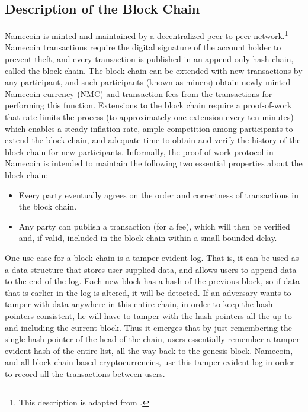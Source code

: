 \subsection{Description of the Block Chain}
Namecoin is minted and maintained by a decentralized peer-to-peer network.\footnote{This description is adapted from \cite{bonneau2014decentralizing}.}
Namecoin transactions require the digital signature of the account holder to prevent theft, and every transaction is published in an append-only hash chain, called the block chain. The block chain can be extended with new transactions by any participant, and such participants (known as miners) obtain newly minted Namecoin currency (NMC) and transaction fees from the transactions for performing this function. Extensions to the block chain require a proof-of-work that rate-limits the process (to approximately one extension every ten minutes) which enables a steady inflation rate, ample competition among participants to extend the block chain, and adequate time to obtain and verify the history of the block chain for new participants. Informally, the proof-of-work protocol in Namecoin is intended to maintain the following two essential properties about the block chain:

\begin{itemize}

  \item Every party eventually agrees on the order and correctness of transactions in the block chain.
  \item Any party can publish a transaction (for a fee), which will then be verified and, if valid, included in the block chain within a small bounded delay.

\end{itemize}

One use case for a block chain is a tamper-evident log. That is, it can be used as a data structure that stores user-supplied data, and allows users to append data to the end of the log. Each new block has a hash of the previous block, so if data that is earlier in the log is altered, it will be detected. If an adversary wants to tamper with data anywhere in this entire chain, in order to keep the hash pointers consistent, he will have to tamper with the hash pointers all the up to and including the current block. Thus it emerges that by just remembering the single hash pointer of the head of the chain, users essentially remember a tamper-evident hash of the entire list, all the way back to the genesis block. Namecoin, and all block chain based cryptocurrencies, use this tamper-evident log in order to record all the transactions between users. 


